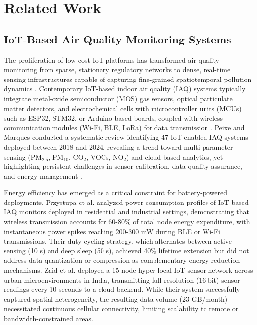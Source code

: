 \section{Related Work}

\subsection{IoT-Based Air Quality Monitoring Systems}

The proliferation of low-cost IoT platforms has transformed air quality monitoring from sparse, stationary regulatory networks to dense, real-time sensing infrastructures capable of capturing fine-grained spatiotemporal pollution dynamics \cite{garcia2025advancements}. Contemporary IoT-based indoor air quality (IAQ) systems typically integrate metal-oxide semiconductor (MOS) gas sensors, optical particulate matter detectors, and electrochemical cells with microcontroller units (MCUs) such as ESP32, STM32, or Arduino-based boards, coupled with wireless communication modules (Wi-Fi, BLE, LoRa) for data transmission \cite{bakare2026iot, petrica2026realtime}. Peixe and Marques \cite{peixe2024lowcost} conducted a systematic review identifying 47 IoT-enabled IAQ systems deployed between 2018 and 2024, revealing a trend toward multi-parameter sensing (PM$_{2.5}$, PM$_{10}$, CO$_2$, VOCs, NO$_2$) and cloud-based analytics, yet highlighting persistent challenges in sensor calibration, data quality assurance, and energy management \cite{kim2025machine}.

Energy efficiency has emerged as a critical constraint for battery-powered deployments. Przystupa et al. \cite{przystupa2025ensuring} analyzed power consumption profiles of IoT-based IAQ monitors deployed in residential and industrial settings, demonstrating that wireless transmission accounts for 60-80\% of total node energy expenditure, with instantaneous power spikes reaching 200-300 mW during BLE or Wi-Fi transmissions. Their duty-cycling strategy, which alternates between active sensing (10 s) and deep sleep (50 s), achieved 40\% lifetime extension but did not address data quantization or compression as complementary energy reduction mechanisms. Zaid et al. \cite{zaid2025investigating} deployed a 15-node hyper-local IoT sensor network across urban microenvironments in India, transmitting full-resolution (16-bit) sensor readings every 10 seconds to a cloud backend. While their system successfully captured spatial heterogeneity, the resulting data volume (23 GB/month) necessitated continuous cellular connectivity, limiting scalability to remote or bandwidth-constrained areas.

